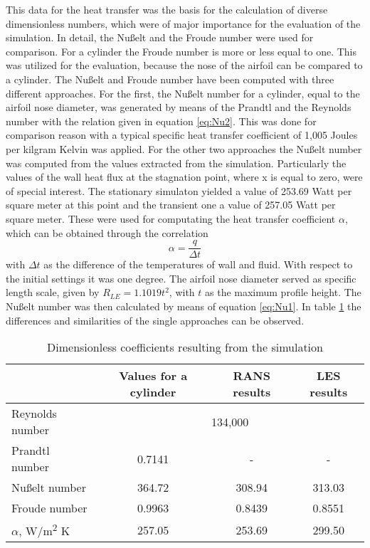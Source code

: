 This data for the heat transfer was the basis for the calculation of diverse dimensionless numbers, which were of major importance for the evaluation of the simulation.
In detail, the Nußelt and the Froude number were used for comparison. For a cylinder the Froude number is more or less equal to one. This was utilized for the evaluation, because the nose of the airfoil can be compared to a cylinder.
The Nußelt and Froude number have been computed with three different approaches. For the first, the Nußelt number for a cylinder, equal to the airfoil nose diameter, was generated by means of the Prandtl and the Reynolds number with the relation given in equation \ref{eq:Nu2}. This was done for comparison reason with a typical specific heat transfer coefficient of 1,005 Joules per kilgram Kelvin was applied.
For the other two approaches the Nußelt number was computed from the values extracted from the simulation. Particularly the values of the wall heat flux at the stagnation point, where x is equal to zero, were of special interest. The stationary simulaton yielded a value of 253.69 Watt per square meter at this point and the transient one a value of 257.05 Watt per square meter. These were used  for computating the heat transfer coefficient $\alpha$, which can be obtained through the correlation
\begin{equation}
\alpha = \frac{q}{\Delta t}
\end{equation} 
with $\Delta t$ as the difference of the temperatures of wall and fluid. With respect to the initial settings it was one degree. The airfoil nose diameter served as specific length scale, given by $R_{LE} = 1.1019 t^2$, with $t$ as the maximum profile height.
The Nußelt number was then calculated by means of equation \ref{eq:Nu1}.
In table \ref{tab:coefficients} the differences and similarities of the single approaches can be observed.

\begin{table}[ht]
\centering
\caption{Dimensionless coefficients resulting from the simulation}
\label{tab:coefficients}
\begin{tabular}{l | ccc}
&Values for a cylinder&RANS results&LES results\\
\hline
Reynolds number&\multicolumn{3}{c}{134,000}\\
Prandtl number&0.7141&-&-\\
Nußelt number&364.72&308.94&313.03\\
Froude number&0.9963&0.8439&0.8551\\
$\alpha$, W/m\textsuperscript{2} K&257.05&253.69&299.50\\
\end{tabular}
\end{table}
